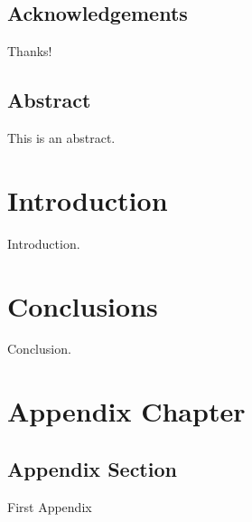 \documentclass[oneside,letterpaper]{memoir}
\begin{document}
\frontmatter

\thetitlepage
\copyrightpage

\section*{Acknowledgements}
Thanks!

\newpage
\section*{Abstract}

This is an abstract.

\newpage
\tableofcontents
\listoffigures
\listoftables

\mainmatter

\chapter{Introduction}
Introduction.

\chapter{Conclusions}
Conclusion.

\appendix
\chapter{Appendix Chapter}
\section{Appendix Section}
First Appendix

\backmatter
\end{document}
